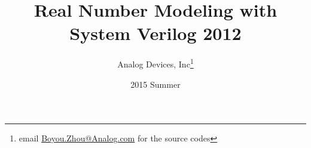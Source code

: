 %  

\documentclass[12pt]{article} %




\title{Real Number Modeling with System Verilog 2012}
\date{2015 Summer}
\author{ 
  Analog Devices, Inc\thanks{email \href{mailto:Boyou.Zhou@Analog.com}{Boyou.Zhou@Analog.com} 
    for the source codes}
}


        \maketitle
        
        \section *{Motivation}
        \label{sec:motivation}
        \pagebreak
        \tableofcontents

        \pagebreak
             
        \section{Introduction}


        \section{Conclusions}
        \label{sec:conclusion}

\begin{lstlisting}
    path\to\your{} parameters ....
\end{lstlisting}
        
        \pagebreak
        
        
        

